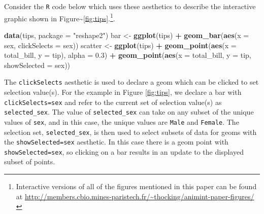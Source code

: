 \documentclass[12pt,]{article}
\newenvironment{Shaded}{\begin{snugshade}}{\end{snugshade}}
\newcommand{\DataTypeTok}[1]{\textcolor[rgb]{0.13,0.29,0.53}{#1}}
\newcommand{\FloatTok}[1]{\textcolor[rgb]{0.00,0.00,0.81}{#1}}
\newcommand{\KeywordTok}[1]{\textcolor[rgb]{0.13,0.29,0.53}{\textbf{#1}}}
\newcommand{\NormalTok}[1]{#1}
\newcommand{\OperatorTok}[1]{\textcolor[rgb]{0.81,0.36,0.00}{\textbf{#1}}}
\newcommand{\StringTok}[1]{\textcolor[rgb]{0.31,0.60,0.02}{#1}}
\let\rmarkdownfootnote\footnote%
\def\footnote{\protect\rmarkdownfootnote}
\theoremstyle{definition}
\theoremstyle{definition}
\theoremstyle{definition}
\theoremstyle{remark}
\begin{document}
Consider the \texttt{R} code below which uses these aesthetics to
describe the interactive graphic shown in
Figure\textasciitilde{}\ref{fig:tips}.\footnote{Interactive versions
of all of the figures mentioned in this paper can be found at
\url{http://members.cbio.mines-paristech.fr/~thocking/animint-paper-figures/}}.

\begin{Shaded}
\begin{Highlighting}[]
\KeywordTok{data}\NormalTok{(tips, }\DataTypeTok{package =} \StringTok{"reshape2"}\NormalTok{)}
\NormalTok{bar <-}\StringTok{ }\KeywordTok{ggplot}\NormalTok{(tips) }\OperatorTok{+}\StringTok{ }
\StringTok{  }\KeywordTok{geom_bar}\NormalTok{(}\KeywordTok{aes}\NormalTok{(}\DataTypeTok{x =}\NormalTok{ sex, }\DataTypeTok{clickSelects =}\NormalTok{ sex))}
\NormalTok{scatter <-}\StringTok{ }\KeywordTok{ggplot}\NormalTok{(tips) }\OperatorTok{+}
\StringTok{  }\KeywordTok{geom_point}\NormalTok{(}\KeywordTok{aes}\NormalTok{(}\DataTypeTok{x =}\NormalTok{ total_bill, }\DataTypeTok{y =}\NormalTok{ tip), }\DataTypeTok{alpha =} \FloatTok{0.3}\NormalTok{) }\OperatorTok{+}
\StringTok{  }\KeywordTok{geom_point}\NormalTok{(}\KeywordTok{aes}\NormalTok{(}\DataTypeTok{x =}\NormalTok{ total_bill, }\DataTypeTok{y =}\NormalTok{ tip, }\DataTypeTok{showSelected =}\NormalTok{ sex))}
\end{Highlighting}
\end{Shaded}

The \texttt{clickSelects} aesthetic is used to declare a geom which can
be clicked to set selection value(s). For the example in Figure
\ref{fig:tips}, we declare a bar with \texttt{clickSelects=sex} and
refer to the current set of selection value(s) as
\texttt{selected\_sex}. The value of \texttt{selected\_sex} can take on
any subset of the unique values of \texttt{sex}, and in this case, the
unique values are \texttt{Male} and \texttt{Female}. The selection set,
\texttt{selected\_sex}, is then used to select subsets of data for geoms
with the \texttt{showSelected=sex} aesthetic. In this case there is a
geom point with \texttt{showSelected=sex}, so clicking on a bar results
in an update to the displayed subset of points.
\end{document}
